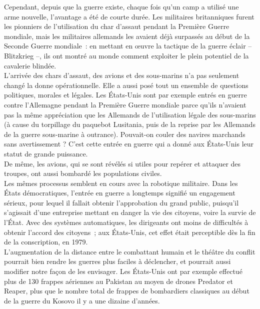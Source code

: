 \documentclass[8pt]{article}
\begin{document}
Cependant, depuis que la guerre existe, chaque fois qu’un camp a utilisé une arme nouvelle, l’avantage a été de courte durée. Les militaires britanniques furent les pionniers de l’utilisation du char d’assaut pendant la Première Guerre mondiale, mais les militaires allemands les avaient déjà surpassés au début de la Seconde Guerre mondiale~: en mettant en œuvre la tactique de la guerre éclair – Blitzkrieg –, ils ont montré au monde comment exploiter le plein potentiel de la cavalerie blindée.\\

L’arrivée des chars d’assaut, des avions et des sous-marins n’a pas seulement changé la donne opérationnelle. Elle a aussi posé tout un ensemble de questions politiques, morales et légales. Les États-Unis sont par exemple entrés en guerre contre l’Allemagne pendant la Première Guerre mondiale parce qu’ils n’avaient pas la même appréciation que les Allemands de l’utilisation légale des sous-marins (à cause du torpillage du paquebot Lusitania, puis de la reprise par les Allemands de la guerre sous-marine à outrance). Pouvait-on couler des navires marchands sans avertissement ? C’est cette entrée en guerre qui a donné aux États-Unis leur statut de grande puissance.\\

De même, les avions, qui se sont révélés si utiles pour repérer et attaquer des troupes, ont aussi bombardé les populations civiles.\\

Les mêmes processus semblent en cours avec la robotique militaire. Dans les États démocratiques, l’entrée en guerre a longtemps signifié un engagement sérieux, pour lequel il fallait obtenir l’approbation du grand public, puisqu’il s’agissait d’une entreprise mettant en danger la vie des citoyens, voire la survie de l’État. Avec des systèmes automatiques, les dirigeants ont moins de difficultés à obtenir l’accord des citoyens~; aux États-Unis, cet effet était perceptible dès la fin de la conscription, en 1979.\\

L’augmentation de la distance entre le combattant humain et le théâtre du conflit pourrait bien rendre les guerres plus faciles à déclencher, et pourrait aussi modifier notre façon de les envisager. Les États-Unis ont par exemple effectué plus de 130 frappes aériennes au Pakistan au moyen de drones Predator et Reaper, plus que le nombre total de frappes de bombardiers classiques au début de la guerre du Kosovo il y a une dizaine d’années.\\
\end{document}

